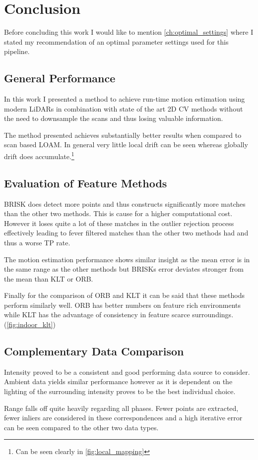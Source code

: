 \chapter{Conclusion}\label{sec:conclusion}

Before concluding this work I would like to mention \cref{ch:optimal_settings} where I stated my recommendation of an optimal parameter settings used for this pipeline.

\section{General Performance}{

    In this work I presented a method to achieve run-time motion estimation using modern LiDARs in combination with state of the art 2D CV methods without the need to downsample the scans and thus losing valuable information.

    The method presented achieves substantially better results when compared to scan based LOAM. In general very little local drift can be seen whereas globally drift does accumulate.\footnote{Can be seen clearly in \cref{fig:local_mapping}}

}

\section{Evaluation of Feature Methods}{
    BRISK does detect more points and thus constructs significantly more matches than the other two methods. This is cause for a higher computational cost. However it loses quite a lot of these matches in the outlier rejection process effectively leading to fever filtered matches than the other two methods had and thus a worse TP rate. 

    The motion estimation performance shows similar insight as the mean error is in the same range as the other methods but BRISKs error deviates stronger from the mean than KLT or ORB.

    Finally for the comparison of ORB and KLT it can be said that these methods perform similarly well. ORB has better numbers on feature rich environments while KLT has the advantage of consistency in feature scarce surroundings. (\cref{fig:indoor_klt})
}

\section{Complementary Data Comparison}{
    Intensity proved to be a consistent and good performing data source to consider. Ambient data yields similar performance however as it is dependent on the lighting of the surrounding intensity proves to be the best individual choice. 

    Range falls off quite heavily regarding all phases. Fewer points are extracted, fewer inliers are considered in these correspondences and a high iterative error can be seen compared to the other two data types. 
}


